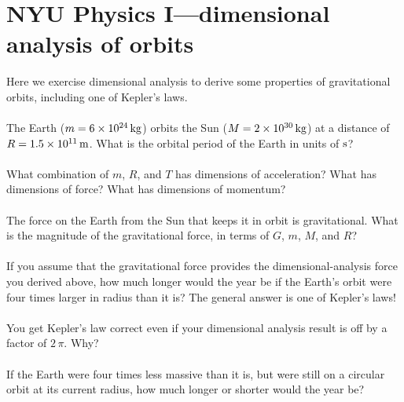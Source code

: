 \documentclass[12pt]{article}
\begin{document}
\section*{NYU Physics I---dimensional analysis of orbits}

Here we exercise dimensional analysis to derive some properties of
gravitational orbits, including one of Kepler's laws.

\paragraph{\theproblem}%
The Earth ($m= 6\times 10^{24}\,\mathrm{kg}$) orbits the Sun ($M= 2\times
10^{30}\,\mathrm{kg}$) at a distance of $R= 1.5\times 10^{11}\,\mathrm{m}$.  What is
the orbital period of the Earth in units of $\mathrm{s}$?

\paragraph{\theproblem}%
What combination of $m$, $R$, and $T$ has dimensions of acceleration?
What has dimensions of force?  What has dimensions of momentum?

\paragraph{\theproblem}%
The force on the Earth from the Sun that keeps it in orbit is
gravitational.  What is the magnitude of the gravitational force, in
terms of $G$, $m$, $M$, and $R$?

\paragraph{\theproblem}%
If you assume that the gravitational force provides the
dimensional-analysis force you derived above, how much longer would
the year be if the Earth's orbit were four times larger in radius than
it is?  The general answer is one of Kepler's laws!

\paragraph{\theproblem}%
You get Kepler's law correct even if your dimensional analysis result
is off by a factor of $2\,\pi$.  Why?

\paragraph{\theproblem}%
If the Earth were four times less massive than it is, but were still on
a circular orbit at its current radius, how much longer or shorter
would the year be?
\end{document}
